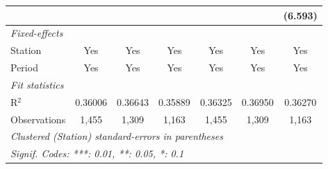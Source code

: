 \begin{table}[htbp]
\begin{tabular}{lcccccc}
                                   &                &                &                &                &               & (6.593)\\   
      \midrule
      \emph{Fixed-effects}\\
      Station                      & Yes            & Yes            & Yes            & Yes            & Yes           & Yes\\  
      Period                       & Yes            & Yes            & Yes            & Yes            & Yes           & Yes\\  
      \midrule
      \emph{Fit statistics}\\
      R$^2$                        & 0.36006        & 0.36643        & 0.35889        & 0.36325        & 0.36950       & 0.36270\\  
      Observations                 & 1,455          & 1,309          & 1,163          & 1,455          & 1,309         & 1,163\\  
      \midrule \midrule
      \multicolumn{7}{l}{\emph{Clustered (Station) standard-errors in parentheses}}\\
      \multicolumn{7}{l}{\emph{Signif. Codes: ***: 0.01, **: 0.05, *: 0.1}}\\
   \end{tabular}
\end{table}


